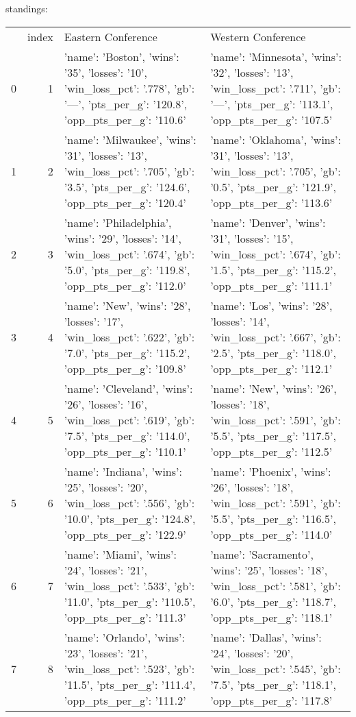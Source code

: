 {} standings:
\begin{tabular}{lrll}
 & index & Eastern Conference & Western Conference \\
0 & 1 & {'name': 'Boston', 'wins': '35', 'losses': '10', 'win_loss_pct': '.778', 'gb': '—', 'pts_per_g': '120.8', 'opp_pts_per_g': '110.6'} & {'name': 'Minnesota', 'wins': '32', 'losses': '13', 'win_loss_pct': '.711', 'gb': '—', 'pts_per_g': '113.1', 'opp_pts_per_g': '107.5'} \\
1 & 2 & {'name': 'Milwaukee', 'wins': '31', 'losses': '13', 'win_loss_pct': '.705', 'gb': '3.5', 'pts_per_g': '124.6', 'opp_pts_per_g': '120.4'} & {'name': 'Oklahoma', 'wins': '31', 'losses': '13', 'win_loss_pct': '.705', 'gb': '0.5', 'pts_per_g': '121.9', 'opp_pts_per_g': '113.6'} \\
2 & 3 & {'name': 'Philadelphia', 'wins': '29', 'losses': '14', 'win_loss_pct': '.674', 'gb': '5.0', 'pts_per_g': '119.8', 'opp_pts_per_g': '112.0'} & {'name': 'Denver', 'wins': '31', 'losses': '15', 'win_loss_pct': '.674', 'gb': '1.5', 'pts_per_g': '115.2', 'opp_pts_per_g': '111.1'} \\
3 & 4 & {'name': 'New', 'wins': '28', 'losses': '17', 'win_loss_pct': '.622', 'gb': '7.0', 'pts_per_g': '115.2', 'opp_pts_per_g': '109.8'} & {'name': 'Los', 'wins': '28', 'losses': '14', 'win_loss_pct': '.667', 'gb': '2.5', 'pts_per_g': '118.0', 'opp_pts_per_g': '112.1'} \\
4 & 5 & {'name': 'Cleveland', 'wins': '26', 'losses': '16', 'win_loss_pct': '.619', 'gb': '7.5', 'pts_per_g': '114.0', 'opp_pts_per_g': '110.1'} & {'name': 'New', 'wins': '26', 'losses': '18', 'win_loss_pct': '.591', 'gb': '5.5', 'pts_per_g': '117.5', 'opp_pts_per_g': '112.5'} \\
5 & 6 & {'name': 'Indiana', 'wins': '25', 'losses': '20', 'win_loss_pct': '.556', 'gb': '10.0', 'pts_per_g': '124.8', 'opp_pts_per_g': '122.9'} & {'name': 'Phoenix', 'wins': '26', 'losses': '18', 'win_loss_pct': '.591', 'gb': '5.5', 'pts_per_g': '116.5', 'opp_pts_per_g': '114.0'} \\
6 & 7 & {'name': 'Miami', 'wins': '24', 'losses': '21', 'win_loss_pct': '.533', 'gb': '11.0', 'pts_per_g': '110.5', 'opp_pts_per_g': '111.3'} & {'name': 'Sacramento', 'wins': '25', 'losses': '18', 'win_loss_pct': '.581', 'gb': '6.0', 'pts_per_g': '118.7', 'opp_pts_per_g': '118.1'} \\
7 & 8 & {'name': 'Orlando', 'wins': '23', 'losses': '21', 'win_loss_pct': '.523', 'gb': '11.5', 'pts_per_g': '111.4', 'opp_pts_per_g': '111.2'} & {'name': 'Dallas', 'wins': '24', 'losses': '20', 'win_loss_pct': '.545', 'gb': '7.5', 'pts_per_g': '118.1', 'opp_pts_per_g': '117.8'} \\

\end{tabular}
